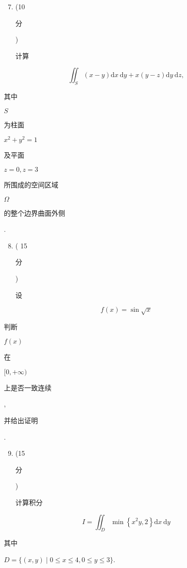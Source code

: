 \documentclass[10pt]{article}
\begin{document}
\begin{enumerate}
  \setcounter{enumi}{6}
  \item (10 \begin{CJK}{UTF8}{mj}分\end{CJK}) \begin{CJK}{UTF8}{mj}计算\end{CJK}
\end{enumerate}
$$
\iint_{S}(x-y) \mathrm{d} x \mathrm{~d} y+x(y-z) \mathrm{d} y \mathrm{~d} z,
$$
\begin{CJK}{UTF8}{mj}其中\end{CJK} $S$ \begin{CJK}{UTF8}{mj}为柱面\end{CJK} $x^{2}+y^{2}=1$ \begin{CJK}{UTF8}{mj}及平面\end{CJK} $z=0, z=3$ \begin{CJK}{UTF8}{mj}所围成的空间区域\end{CJK} $\Omega$ \begin{CJK}{UTF8}{mj}的整个边界曲面外侧\end{CJK}.

\begin{enumerate}
  \setcounter{enumi}{7}
  \item ( 15 \begin{CJK}{UTF8}{mj}分\end{CJK}) \begin{CJK}{UTF8}{mj}设\end{CJK}
\end{enumerate}
$$
f(x)=\sin \sqrt{x}
$$
\begin{CJK}{UTF8}{mj}判断\end{CJK} $f(x)$ \begin{CJK}{UTF8}{mj}在\end{CJK} $[0,+\infty)$ \begin{CJK}{UTF8}{mj}上是否一致连续\end{CJK}, \begin{CJK}{UTF8}{mj}并给出证明\end{CJK}.

\begin{enumerate}
  \setcounter{enumi}{8}
  \item (15 \begin{CJK}{UTF8}{mj}分\end{CJK}) \begin{CJK}{UTF8}{mj}计算积分\end{CJK}
\end{enumerate}
$$
I=\iint_{D} \min \left\{x^{2} y, 2\right\} \mathrm{d} x \mathrm{~d} y
$$
\begin{CJK}{UTF8}{mj}其中\end{CJK} $D=\{(x, y) \mid 0 \leq x \leq 4,0 \leq y \leq 3\}$.
\end{document}

